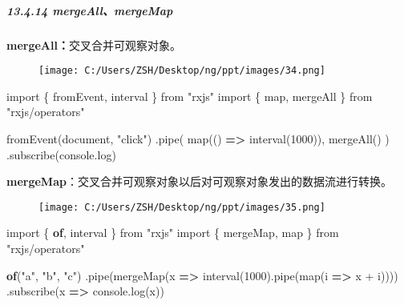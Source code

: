 \documentclass[
]{article}
\newenvironment{Shaded}{}{}
\newcommand{\BuiltInTok}[1]{#1}
\newcommand{\DecValTok}[1]{\textcolor[rgb]{0.25,0.63,0.44}{#1}}
\newcommand{\FunctionTok}[1]{\textcolor[rgb]{0.02,0.16,0.49}{#1}}
\newcommand{\ImportTok}[1]{#1}
\newcommand{\KeywordTok}[1]{\textcolor[rgb]{0.00,0.44,0.13}{\textbf{#1}}}
\newcommand{\NormalTok}[1]{#1}
\newcommand{\OperatorTok}[1]{\textcolor[rgb]{0.40,0.40,0.40}{#1}}
\newcommand{\StringTok}[1]{\textcolor[rgb]{0.25,0.44,0.63}{#1}}
\begin{document}
\hypertarget{13414-mergeallmergemap}{%
\subparagraph{13.4.14 mergeAll、mergeMap}\label{13414-mergeallmergemap}}

\textbf{mergeAll：}交叉合并可观察对象。

\begin{figure}
\centering
\texttt{[image: C:/Users/ZSH/Desktop/ng/ppt/images/34.png]}
\caption{}
\end{figure}

\begin{Shaded}
\begin{Highlighting}[]
\ImportTok{import}\NormalTok{ \{ fromEvent}\OperatorTok{,}\NormalTok{ interval \} }\ImportTok{from} \StringTok{"rxjs"}
\ImportTok{import}\NormalTok{ \{ map}\OperatorTok{,}\NormalTok{ mergeAll \} }\ImportTok{from} \StringTok{"rxjs/operators"}

\FunctionTok{fromEvent}\NormalTok{(}\BuiltInTok{document}\OperatorTok{,} \StringTok{"click"}\NormalTok{)}
  \OperatorTok{.}\FunctionTok{pipe}\NormalTok{(}
    \FunctionTok{map}\NormalTok{(() }\KeywordTok{=\textgreater{}} \FunctionTok{interval}\NormalTok{(}\DecValTok{1000}\NormalTok{))}\OperatorTok{,}
    \FunctionTok{mergeAll}\NormalTok{()}
\NormalTok{  )}
  \OperatorTok{.}\FunctionTok{subscribe}\NormalTok{(}\BuiltInTok{console}\OperatorTok{.}\FunctionTok{log}\NormalTok{)}
\end{Highlighting}
\end{Shaded}

\textbf{mergeMap}：交叉合并可观察对象以后对可观察对象发出的数据流进行转换。

\begin{figure}
\centering
\texttt{[image: C:/Users/ZSH/Desktop/ng/ppt/images/35.png]}
\caption{}
\end{figure}

\begin{Shaded}
\begin{Highlighting}[]
\ImportTok{import}\NormalTok{ \{ }\KeywordTok{of}\OperatorTok{,}\NormalTok{ interval \} }\ImportTok{from} \StringTok{"rxjs"}
\ImportTok{import}\NormalTok{ \{ mergeMap}\OperatorTok{,}\NormalTok{ map \} }\ImportTok{from} \StringTok{"rxjs/operators"}

\KeywordTok{of}\NormalTok{(}\StringTok{"a"}\OperatorTok{,} \StringTok{"b"}\OperatorTok{,} \StringTok{"c"}\NormalTok{)}
  \OperatorTok{.}\FunctionTok{pipe}\NormalTok{(}\FunctionTok{mergeMap}\NormalTok{(x }\KeywordTok{=\textgreater{}} \FunctionTok{interval}\NormalTok{(}\DecValTok{1000}\NormalTok{)}\OperatorTok{.}\FunctionTok{pipe}\NormalTok{(}\FunctionTok{map}\NormalTok{(i }\KeywordTok{=\textgreater{}}\NormalTok{ x }\OperatorTok{+}\NormalTok{ i))))}
  \OperatorTok{.}\FunctionTok{subscribe}\NormalTok{(x }\KeywordTok{=\textgreater{}} \BuiltInTok{console}\OperatorTok{.}\FunctionTok{log}\NormalTok{(x))}
\end{Highlighting}
\end{Shaded}
\end{document}
